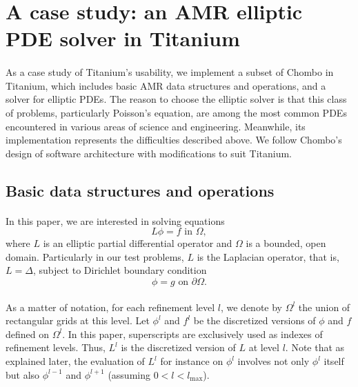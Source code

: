\documentclass{ieee}
\numberwithin{equation}{section}
\begin{document}
\section{A case study: an AMR elliptic PDE solver in Titanium}

\paragraph{}As a case study of Titanium's usability, we implement a subset of Chombo in Titanium, which includes basic AMR data structures and operations, and a solver for elliptic PDEs. The reason to choose the elliptic solver is that this class of problems, particularly Poisson's equation, are among the most common PDEs encountered in various areas of science and engineering. Meanwhile, its implementation represents the difficulties described above. We follow Chombo's design of software architecture with modifications to suit Titanium.

\subsection{Basic data structures and operations}

\paragraph{}In this paper, we are interested in solving equations
\begin{equation}
L\phi=f \text{ in } \Omega, \label{ellipticPDE}
\end{equation}
where $L$ is an elliptic partial differential operator and $\Omega$ is a bounded, open domain. Particularly in our test problems, $L$ is the Laplacian operator, that is, $L=\Delta$, subject to Dirichlet boundary condition 
\begin{equation}
\phi=g \text{ on } \partial \Omega. \label{Dirichlet}
\end{equation}

\paragraph{}As a matter of notation, for each refinement level $l$, we denote by $\Omega^{l}$ the union of rectangular grids at this level. Let $\phi^l$ and $f^l$ be the discretized versions of $\phi$ and $f$ defined on $\Omega^{l}$. In this paper, superscripts are exclusively used as indexes of refinement levels. Thus, $L^l$ is the discretized version of $L$ at level $l$. Note that as explained later, the evaluation of $L^l$ for instance on $\phi^l$ involves not only $\phi^l$ itself but also $\phi^{l-1}$ and $\phi^{l+1}$ (assuming $0<l<l_{\text{max}}$).
\end{document}

